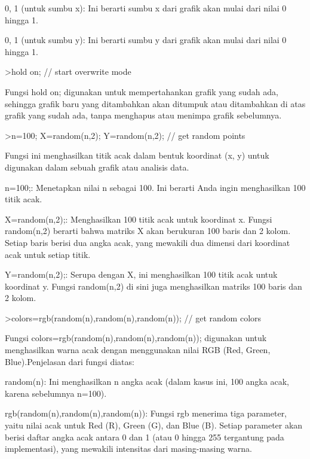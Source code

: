 \documentclass[a4paper,10pt]{article}
\begin{document}
\begin{eulernotebook}
\begin{eulercomment}
0, 1 (untuk sumbu x): Ini berarti sumbu x dari grafik akan mulai dari
nilai 0 hingga 1.

0, 1 (untuk sumbu y): Ini berarti sumbu y dari grafik akan mulai dari
nilai 0 hingga 1.
\end{eulercomment}
\begin{eulerprompt}
>hold on; // start overwrite mode
\end{eulerprompt}
\begin{eulercomment}
Fungsi hold on; digunakan untuk mempertahankan grafik yang sudah ada,
sehingga grafik baru yang ditambahkan akan ditumpuk atau ditambahkan
di atas grafik yang sudah ada, tanpa menghapus atau menimpa grafik
sebelumnya.
\end{eulercomment}
\begin{eulerprompt}
>n=100; X=random(n,2); Y=random(n,2);  // get random points
\end{eulerprompt}
\begin{eulercomment}
Fungsi ini menghasilkan titik acak dalam bentuk koordinat (x, y) untuk
digunakan dalam sebuah grafik atau analisis data.

n=100;: Menetapkan nilai n sebagai 100. Ini berarti Anda ingin
menghasilkan 100 titik acak.

X=random(n,2);: Menghasilkan 100 titik acak untuk koordinat x. Fungsi
random(n,2) berarti bahwa matriks X akan berukuran 100 baris dan 2
kolom. Setiap baris berisi dua angka acak, yang mewakili dua dimensi
dari koordinat acak untuk setiap titik.

Y=random(n,2);: Serupa dengan X, ini menghasilkan 100 titik acak untuk
koordinat y. Fungsi random(n,2) di sini juga menghasilkan matriks 100
baris dan 2 kolom.
\end{eulercomment}
\begin{eulerprompt}
>colors=rgb(random(n),random(n),random(n)); // get random colors
\end{eulerprompt}
\begin{eulercomment}
Fungsi colors=rgb(random(n),random(n),random(n)); digunakan untuk
menghasilkan warna acak dengan menggunakan nilai RGB (Red, Green,
Blue).Penjelasan dari fungsi diatas:

random(n): Ini menghasilkan n angka acak (dalam kasus ini, 100 angka
acak, karena sebelumnya n=100).

rgb(random(n),random(n),random(n)): Fungsi rgb menerima tiga
parameter, yaitu nilai acak untuk Red (R), Green (G), dan Blue (B).
Setiap parameter akan berisi daftar angka acak antara 0 dan 1 (atau 0
hingga 255 tergantung pada implementasi), yang mewakili intensitas
dari masing-masing warna.


\end{eulercomment}
\end{eulernotebook}
\end{document}
